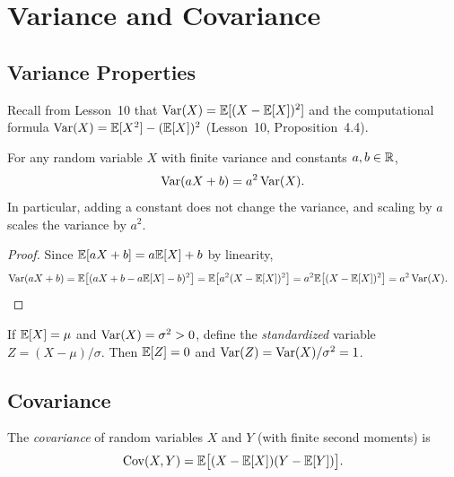 \documentclass[11pt,a4paper]{article}
\begin{document}

\section{Variance and Covariance}
\label{sec:variance}

\subsection{Variance Properties}

Recall from Lesson~10 that $\operatorname{Var}(X) = \mathbb{E}[(X - \mathbb{E}[X])^2]$ and the
computational formula $\operatorname{Var}(X) = \mathbb{E}[X^2] - (\mathbb{E}[X])^2$
(Lesson~10, Proposition~4.4).

\begin{proposition}
\label{prop:affine_var}
For any random variable $X$ with finite variance and constants
$a, b \in \mathbb{R}$,
\[
    \operatorname{Var}(aX + b) = a^2 \operatorname{Var}(X).
\]
In particular, adding a constant does not change the variance, and
scaling by $a$ scales the variance by $a^2$.
\end{proposition}

\begin{proof}
Since $\mathbb{E}[aX + b] = a\mathbb{E}[X] + b$ by linearity,
\begin{align*}
    \operatorname{Var}(aX + b) &= \mathbb{E}\bigl[(aX + b - a\mathbb{E}[X] - b)^2\bigr]
    = \mathbb{E}\bigl[a^2(X - \mathbb{E}[X])^2\bigr]
    = a^2 \mathbb{E}\bigl[(X - \mathbb{E}[X])^2\bigr]
    = a^2 \operatorname{Var}(X). \qedhere
\end{align*}
\end{proof}

\begin{example}[Standardization]
\label{ex:standardization}
If $\mathbb{E}[X] = \mu$ and $\operatorname{Var}(X) = \sigma^2 > 0$, define the
\emph{standardized} variable $Z = (X - \mu)/\sigma$. Then
$\mathbb{E}[Z] = 0$ and $\operatorname{Var}(Z) = \operatorname{Var}(X)/\sigma^2 = 1$.
\end{example}

\subsection{Covariance}

\begin{definition}[Covariance]
\label{def:covariance}
The \emph{covariance} of random variables $X$ and $Y$ (with finite
second moments) is
\[
    \operatorname{Cov}(X, Y) = \mathbb{E}\bigl[(X - \mathbb{E}[X])(Y - \mathbb{E}[Y])\bigr].
\]
\end{definition}
\end{document}
